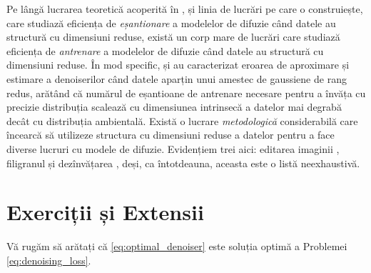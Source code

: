 \documentclass[../../book-main_ro.tex]{subfiles}
\begin{document}
Pe lângă lucrarea teoretică \citep{li2024d} acoperită în , și linia de lucrări pe care o construiește, care studiază eficiența de \textit{eșantionare} a modelelor de difuzie când datele au structură cu dimensiuni reduse, există un corp mare de lucrări care studiază eficiența de \textit{antrenare} a modelelor de difuzie când datele au structură cu dimensiuni reduse. În mod specific, \citet{chen2023score} și \citep{wang2024diffusion} au caracterizat eroarea de aproximare și estimare a denoiserilor când datele aparțin unui amestec de gaussiene de rang redus, arătând că numărul de eșantioane de antrenare necesare pentru a învăța cu precizie distribuția scalează cu dimensiunea intrinsecă a datelor mai degrabă decât cu distribuția ambientală. Există o lucrare \textit{metodologică} considerabilă care încearcă să utilizeze structura cu dimensiuni reduse a datelor pentru a face diverse lucruri cu modele de difuzie. Evidențiem trei aici: editarea imaginii \citep{chen2024exploring}, filigranul \citep{li2024shallow} și dezînvățarea \citep{chen2025dual}, deși, ca întotdeauna, aceasta este o listă neexhaustivă.

\section{Exerciții și Extensii}

\begin{exercise}
    Vă rugăm să arătați că \eqref{eq:optimal_denoiser} este soluția optimă a Problemei \eqref{eq:denoising_loss}.
\end{exercise}
\end{document}
